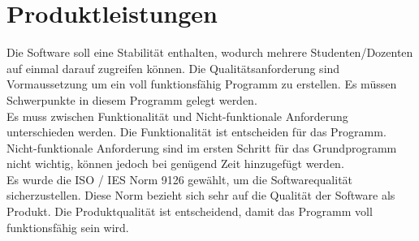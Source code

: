 \chapter{Produktleistungen}
	Die Software soll eine Stabilität enthalten, wodurch mehrere Studenten/Dozenten auf einmal darauf zugreifen können. Die Qualitätsanforderung sind Vormaussetzung um ein voll funktionsfähig Programm zu erstellen. Es müssen Schwerpunkte in diesem Programm gelegt werden.\\
	
	Es muss zwischen Funktionalität und Nicht-funktionale Anforderung unterschieden werden. Die Funktionalität ist entscheiden für das Programm. Nicht-funktionale Anforderung sind im ersten Schritt für das Grundprogramm nicht wichtig, können jedoch bei genügend Zeit hinzugefügt werden.\\
	
	Es wurde die ISO / IES Norm 9126 gewählt, um die Softwarequalität sicherzustellen. Diese Norm bezieht sich sehr auf die Qualität der Software als Produkt. Die Produktqualität ist entscheidend, damit das Programm voll funktionsfähig sein wird. 
